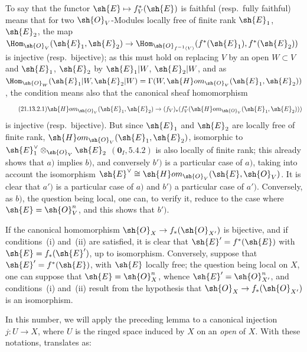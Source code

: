 To say that the functor $\sh{E}\mapsto f_V^*(\sh{E})$ is faithful (resp.\ fully faithful) means that for two $\sh{O}_V$-Modules locally free of finite rank $\sh{E}_1$, $\sh{E}_2$, the map
$\Hom_{\sh{O}_V}(\sh{E}_1,\sh{E}_2)\to\Hom_{\sh{O}_{f^{-1}(V)}}(f^*(\sh{E}_1),f^*(\sh{E}_2))$ is injective (resp.\ bijective); as this must hold on replacing $V$ by an open $W\subset V$ and $\sh{E}_1$, $\sh{E}_2$ by $\sh{E}_1|W$, $\sh{E}_2|W$, and as $\Hom_{\sh{O}_W}(\sh{E}_1|W,\sh{E}_2|W)=\Gamma(W,\sh{H}om_{\sh{O}_V}(\sh{E}_1,\sh{E}_2))$, the condition means also that the canonical sheaf homomorphism
\begin{equation*}
\tag{21.13.2.1}
  \sh{H}om_{\sh{O}_V}(\sh{E}_1,\sh{E}_2)\to(f_V)_*(f_V^*(\sh{H}om_{\sh{O}_V}(\sh{E}_1,\sh{E}_2)))
\end{equation*}
is injective (resp.\ bijective).
But since $\sh{E}_1$ and $\sh{E}_2$ are locally free of finite rank, $\sh{H}om_{\sh{O}_V}(\sh{E}_1,\sh{E}_2)$, isomorphic to $\sh{E}_1^\vee\otimes_{\sh{O}_V}\sh{E}_2$ $(\mathbf{0}_I, 5.4.2)$ is also locally of finite rank; this already shows that $a)$ implies $b)$, and conversely $b')$ is a particular case of $a)$, taking into account the isomorphism $\sh{E}^\vee\cong\sh{H}om_{\sh{O}_V}(\sh{E},\sh{O}_V)$.
It is clear that $a')$ is a particular case of $a)$ and $b')$ a particular case of $a')$.
Conversely, as $b)$, the question being local, one can, to verify it, reduce to the case where $\sh{E}=\sh{O}_V^n$, and this shows that $b')$.

If the canonical homomorphism $\sh{O}_X\to f_*(\sh{O}_{X'})$ is bijective, and if conditions~(i) and~(ii) are satisfied, it is clear that $\sh{E}'=f^*(\sh{E})$ with $\sh{E}=f_*(\sh{E}')$, up to isomorphism.
Conversely, suppose that $\sh{E}'=f^*(\sh{E})$, with $\sh{E}$ locally free; the question being local on $X$, one can suppose that $\sh{E}=\sh{O}_X^n$, whence $\sh{E}'=\sh{O}_{X'}^n$, and conditions~(i) and~(ii) result from the hypothesis that $\sh{O}_X\to f_*(\sh{O}_{X'})$ is an isomorphism.

In this number, we will apply the preceding lemma to a canonical injection $j:U\to X$, where $U$ is the ringed space induced by $X$ on an \emph{open} of $X$.
With these notations,  translates as:

